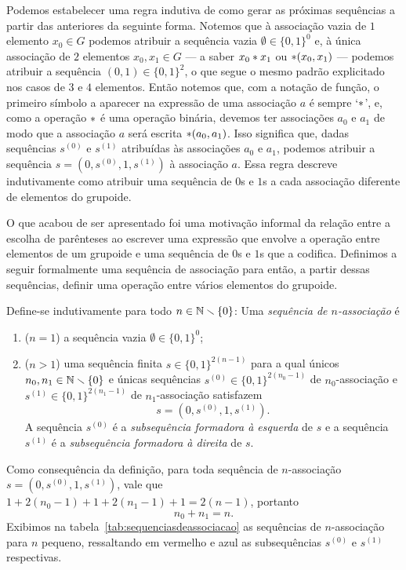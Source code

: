Podemos estabelecer uma regra indutiva de como gerar as próximas sequências a partir das anteriores da seguinte forma. Notemos que à associação vazia de $1$ elemento $x_0 \in G$ podemos atribuir a sequência vazia $\emptyset \in \{0,1\}^{0}$ e, à única associação de $2$ elementos $x_0, x_1 \in G$ --- a saber $x_0 \ast x_1$ ou $\ast(x_0,x_1)$ --- podemos atribuir a sequência $(0,1) \in \{0,1\}^{2}$, o que segue o mesmo padrão explicitado nos casos de $3$ e $4$ elementos. Então notemos que, com a notação de função, o primeiro símbolo a aparecer na expressão de uma associação $a$ é sempre `$\ast$', e, como a operação $\ast$ é uma operação binária, devemos ter associações $a_0$ e $a_1$ de modo que a associação $a$ será escrita $\ast(a_0,a_1)$. Isso significa que, dadas sequências $s^{(0)}$ e $s^{(1)}$ atribuídas às associações $a_0$ e $a_1$, podemos atribuir a sequência $s = (0,s^{(0)},1,s^{(1)})$ à associação $a$. Essa regra descreve indutivamente como atribuir uma sequência de $0$s e $1$s a cada associação diferente de elementos do grupoide.

O que acabou de ser apresentado foi uma motivação informal da relação entre a escolha de parênteses ao escrever uma expressão que envolve a operação entre elementos de um grupoide e uma sequência de $0$s e $1$s que a codifica. Definimos a seguir formalmente uma sequência de associação para então, a partir dessas sequências, definir uma operação entre vários elementos do grupoide.

\begin{definition}
Define-se indutivamente para todo $n \in \mathbb{N} \smallsetminus \{0\}$:
Uma \emph{sequência de $n$-associação} é
	\begin{enumerate}
	\item ($n=1$) a sequência vazia $\emptyset \in \{0,1\}^{0}$;
	\item ($n>1$) uma sequência finita $s \in \{0,1\}^{2(n-1)}$ para a qual únicos $n_0, n_1 \in \mathbb{N} \smallsetminus \{0\}$ e únicas sequências $s^{(0)} \in \{0,1\}^{2(n_0-1)}$ de $n_0$-associação e $s^{(1)} \in \{0,1\}^{2(n_1-1)}$ de $n_1$-associação satisfazem
		\begin{equation*}
		s=(0,s^{(0)},1,s^{(1)}).
		\end{equation*}
	A sequência $s^{(0)}$ é a \emph{subsequência formadora à esquerda} de $s$ e a sequência $s^{(1)}$ é a \emph{subsequência formadora à direita} de $s$.
	\end{enumerate}
\end{definition}

Como consequência da definição, para toda sequência de $n$-associação $s=(0,s^{(0)},1,s^{(1)})$, vale que $1 + 2(n_0-1) + 1 + 2(n_1-1) + 1 = 2(n-1)$, portanto
	\begin{equation*}
	n_0 + n_1 = n.
	\end{equation*}
Exibimos na tabela~\ref{tab:sequenciasdeassociacao} as sequências de $n$-associação para $n$ pequeno, ressaltando em vermelho e azul as subsequências $s^{(0)}$ e $s^{(1)}$ respectivas.

